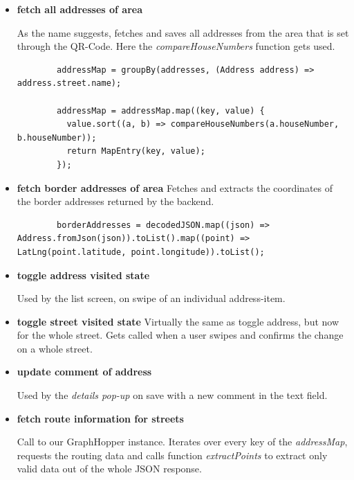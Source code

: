 \begin{itemize}
    \item \textbf{fetch all addresses of area}
    
    As the name suggests, fetches and saves all addresses from the area that is set through the QR-Code. Here the \textit{compareHouseNumbers} function gets used.

    \lstset{style=generic, caption=use of compareHouseNumbers function (AddressProvider.dart)}
    \begin{lstlisting}
        addressMap = groupBy(addresses, (Address address) => address.street.name);

        addressMap = addressMap.map((key, value) {
          value.sort((a, b) => compareHouseNumbers(a.houseNumber, b.houseNumber));
          return MapEntry(key, value);
        });
    \end{lstlisting}

    \item \textbf{fetch border addresses of area}
    Fetches and extracts the coordinates of the border addresses returned by the backend.

    \lstset{style=generic, caption=extraction of coordinates from border addresses (AddressProvider.dart)}
    \begin{lstlisting}
        borderAddresses = decodedJSON.map((json) => Address.fromJson(json)).toList().map((point) => LatLng(point.latitude, point.longitude)).toList();
    \end{lstlisting}

    \item \textbf{toggle address visited state}
    
    Used by the list screen, on swipe of an individual address-item.

    \item \textbf{toggle street visited state}
    Virtually the same as toggle address, but now for the whole street. Gets called when a user swipes and confirms the change on a whole street.

    \item \textbf{update comment of address}
    
    Used by the \textit{details pop-up} on save with a new comment in the text field.

    \item \textbf{fetch route information for streets}
    
    Call to our GraphHopper instance. Iterates over every key of the \textit{addressMap}, requests the routing data and calls function \textit{extractPoints} to extract only valid data out of the whole JSON response.
    
\end{itemize}

